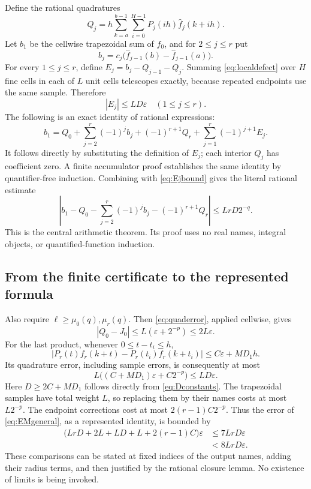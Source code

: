 \documentclass[11pt]{article}
\theoremstyle{definition}
\newcommand{\eps}{\varepsilon}
\newcommand{\abs}[1]{\left|#1\right|}
\begin{document}
Define the rational quadratures
\begin{equation}
 Q_j=h\sum_{k=a}^{b-1}\sum_{i=0}^{H-1}
           P_j(ih)\widehat f_j(k+ih).\label{eq:Q}
\end{equation}
Let \(b_1\) be the cellwise trapezoidal sum of \(\widehat f_0\), and
for \(2\le j\le r\) put
\[
 b_j=c_j\bigl(\widehat f_{j-1}(b)-\widehat f_{j-1}(a)\bigr).
\]
For every \(1\le j\le r\), define
\(E_j=b_j-Q_{j-1}-Q_j\).
Summing \eqref{eq:localdefect} over \(H\) fine cells in each of \(L\)
unit cells telescopes exactly, because repeated endpoints use the same
sample.  Therefore
\begin{equation}
 \abs{E_j}\le LD\eps\quad(1\le j\le r).\label{eq:Ejbound}
\end{equation}
The following is an exact identity of rational expressions:
\begin{equation}
 b_1=Q_0+\sum_{j=2}^r(-1)^j b_j+(-1)^{r+1}Q_r
               +\sum_{j=1}^r(-1)^{j+1}E_j.\label{eq:finiteEMidentity}
\end{equation}
It follows directly by substituting the definition of \(E_j\);
each interior \(Q_j\) has coefficient zero.  A finite accumulator
proof establishes the same identity by quantifier-free induction.
Combining with \eqref{eq:Ejbound} gives the literal rational estimate
\begin{equation}
 \abs{b_1-Q_0-\sum_{j=2}^r(-1)^jb_j-(-1)^{r+1}Q_r}
 \le LrD2^{-q}.\label{eq:finiteEMbound}
\end{equation}
This is the central arithmetic theorem.  Its proof uses no real names,
integral objects, or quantified-function induction.

\subsection{From the finite certificate to the represented formula}

Also require \(\ell\ge\mu_0(q),\mu_r(q)\).  Then
\eqref{eq:quaderror}, applied cellwise, gives
\[
 \abs{Q_0-J_0}\le L(\eps+2^{-p})\le2L\eps.
\]
For the last product, whenever \(0\le t-t_i\le h\),
\[
 \abs{P_r(t)f_r(k+t)-P_r(t_i)f_r(k+t_i)}
 \le C\eps+MD_1h.
\]
Its quadrature error, including sample errors, is consequently at most
\[
 L\bigl((C+MD_1)\eps+C2^{-p}\bigr)
 \le LD\eps.
\]
Here \(D\ge2C+MD_1\) follows directly from \eqref{eq:Dconstants}.
The trapezoidal samples have total weight \(L\), so replacing them by
their names costs at most \(L2^{-p}\).  The endpoint corrections cost
at most \(2(r-1)C2^{-p}\).  Thus the error of
\eqref{eq:EMgeneral}, as a represented identity, is bounded by
\begin{align*}
 \bigl(LrD+2L+LD+L+2(r-1)C\bigr)\eps
 &\le7LrD\eps\\
 &<8LrD\eps.
\end{align*}
These comparisons can be stated at fixed indices of the output names,
adding their radius terms, and then justified by the rational closure
lemma.  No existence of limits is being invoked.
\end{document}
